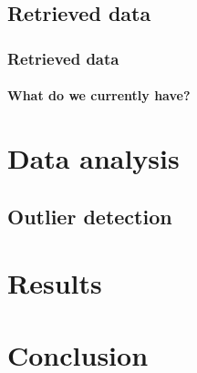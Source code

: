 \documentclass[nonav,sleutel,handout]{beamer}
\begin{document}
\subsection{Retrieved data}
\begin{frame}
\frametitle{Retrieved data}
\framesubtitle{What do we currently have?}

\end{frame}


\section{Data analysis}
\subsection{Outlier detection}
\section{Results}

\section{Conclusion}
\end{document}
